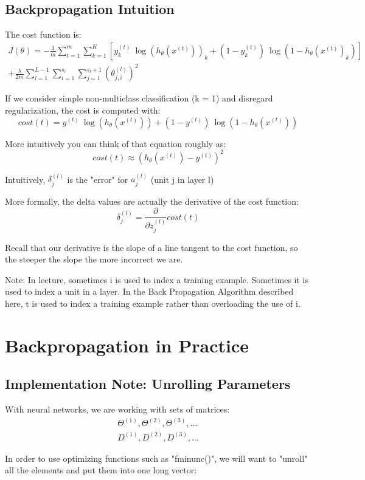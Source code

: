 \documentclass{report}
\begin{document}
\subsection{Backpropagation Intuition}
The cost function is:
\begin{gather*}
	J(\theta) = - \frac{1}{m} \sum_{t=1}^m\sum_{k=1}^K  \left[ y^{(t)}_k \ \log (h_\theta (x^{(t)}))_k + (1 - y^{(t)}_k)\ \log (1 - h_\theta(x^{(t)})_k)\right] \\
	+ \frac{\lambda}{2m}\sum_{l=1}^{L-1} \sum_{i=1}^{s_l} \sum_{j=1}^{s_l+1} ( \theta_{j,i}^{(l)})^2
\end{gather*}

If we consider simple non-multiclass classification (k = 1) and disregard regularization, the cost is computed with:
$$cost(t) =y^{(t)} \ \log (h_\theta (x^{(t)})) + (1 - y^{(t)})\ \log (1 - h_\theta(x^{(t)}))$$

More intuitively you can think of that equation roughly as:
$$cost(t) \approx (h_\theta(x^{(t)})-y^{(t)})^2$$

Intuitively, $\delta_j^{(l)}$ is the "error" for $a^{(l)}_j$ (unit j in layer l)

More formally, the delta values are actually the derivative of the cost function:
$$\delta_j^{(l)} = \dfrac{\partial}{\partial z_j^{(l)}} cost(t)$$

Recall that our derivative is the slope of a line tangent to the cost function, so the steeper the slope the more incorrect we are.

Note: In lecture, sometimes i is used to index a training example. Sometimes it is used to index a unit in a layer. In the Back Propagation Algorithm described here, t is used to index a training example rather than overloading the use of i.

\section{Backpropagation in Practice}
\subsection{Implementation Note: Unrolling Parameters}
With neural networks, we are working with sets of matrices:
\begin{align*}
	\Theta^{(1)}, \Theta^{(2)}, \Theta^{(3)}, \dots \\
	D^{(1)}, D^{(2)}, D^{(3)}, \dots
\end{align*}

In order to use optimizing functions such as "fminunc()", we will want to "unroll" all the elements and put them into one long vector:
\end{document}

